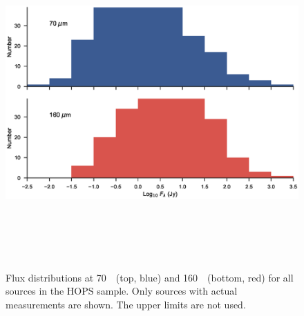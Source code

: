 \documentclass[manuscript]{aastex61}
\begin{document}
\begin{figure}[ht]
\centering
\includegraphics[height=5in]{figures/LFs.eps}
\caption{Flux distributions at 70~\micron\ (top, blue) and 160~\micron\ (bottom, red) for all sources in the HOPS sample.  Only sources with actual measurements are shown.  The upper limits are not used.\label{fig:fd}}
\end{figure}
\end{document}
